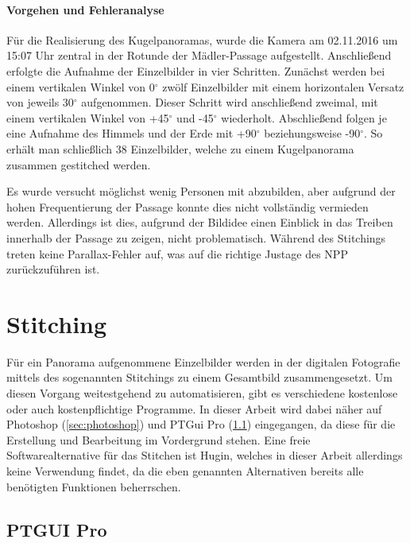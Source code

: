 \documentclass[liststotoc,bibtotoc,fontsize=14pt,]{scrreprt}
\begin{document}
			\subsubsection{Vorgehen und Fehleranalyse}
			Für die Realisierung des Kugelpanoramas, wurde die Kamera am 02.11.2016 um 15:07 Uhr zentral in der Rotunde der Mädler-Passage aufgestellt. Anschließend erfolgte die Aufnahme der Einzelbilder in vier Schritten. Zunächst werden bei einem vertikalen Winkel von 0$^\circ$ zwölf Einzelbilder mit einem horizontalen Versatz von jeweils 30$^\circ$ aufgenommen. Dieser Schritt wird anschließend zweimal, mit einem vertikalen Winkel von +45$^\circ$ und -45$^\circ$ wiederholt. Abschließend folgen je eine Aufnahme des Himmels und der Erde mit +90$^\circ$ beziehungsweise -90$^\circ$. So erhält man schließlich 38 Einzelbilder, welche zu einem Kugelpanorama zusammen gestitched werden.
			
			\bigskip
			Es wurde versucht möglichst wenig Personen mit abzubilden, aber aufgrund der hohen Frequentierung der Passage konnte dies nicht vollständig vermieden werden. Allerdings ist dies, aufgrund der Bildidee einen Einblick in das Treiben innerhalb der Passage zu zeigen, nicht problematisch. Während des Stitchings treten keine Parallax-Fehler auf, was auf die richtige Justage des NPP zurückzuführen ist. 
			
	\chapter{Stitching}
	\label{ch:stitiching}
	Für ein Panorama aufgenommene Einzelbilder werden in der digitalen Fotografie mittels des sogenannten Stitchings zu einem Gesamtbild zusammengesetzt. Um diesen Vorgang weitestgehend zu automatisieren, gibt es verschiedene kostenlose oder auch kostenpflichtige Programme. In dieser Arbeit wird dabei näher auf Photoshop (\ref{sec:photoshop}) und PTGui Pro (\ref{sec:ptgui}) eingegangen, da diese für die Erstellung und Bearbeitung im Vordergrund stehen. Eine freie Softwarealternative für das Stitchen ist Hugin, welches in dieser Arbeit allerdings keine Verwendung findet, da die eben genannten Alternativen bereits alle benötigten Funktionen beherrschen.
	
	\section{PTGUI Pro}
	\label{sec:ptgui}
	
\end{document}
